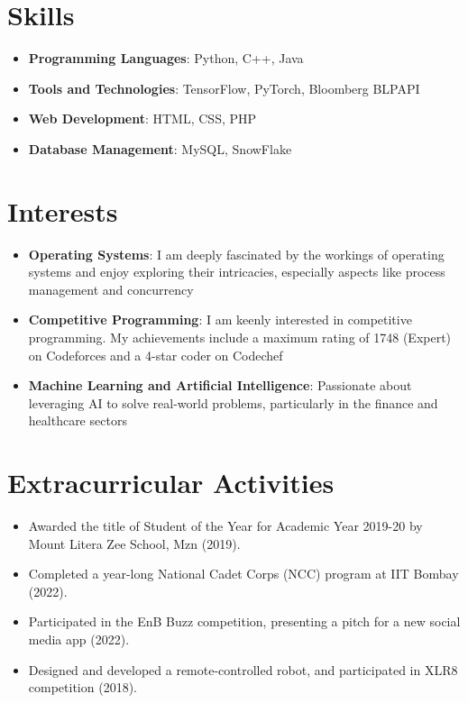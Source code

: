 \documentclass[11pt,letterpaper,sans]{moderncv}
\begin{document}
\vspace{-10pt}

\section{\LARGE Skills}
\vspace{-4pt}
\begin{itemize}[noitemsep, topsep=0pt]
\item \textbf{Programming Languages}: Python, C++, Java
\item \textbf{Tools and Technologies}: TensorFlow, PyTorch, Bloomberg BLPAPI
\item \textbf{Web Development}: HTML, CSS, PHP
\item \textbf{Database Management}: MySQL, SnowFlake
\end{itemize}

\vspace{-10pt}

\section{\LARGE Interests}
\vspace{-4pt}
\begin{itemize}[noitemsep, topsep=0pt]
\item \textbf{Operating Systems}: I am deeply fascinated by the workings of operating systems and enjoy exploring their intricacies, especially aspects like process management and concurrency 
\item \textbf{Competitive Programming}: I am keenly interested in competitive programming. My achievements include a maximum rating of 1748 (Expert) on Codeforces and a 4-star coder on Codechef 
\item \textbf{Machine Learning and Artificial Intelligence}: Passionate about leveraging AI to solve real-world problems, particularly in the finance and healthcare sectors
\end{itemize}
\vspace{-10pt}
\section{\LARGE Extracurricular Activities}
\vspace{-4pt}
\begin{itemize}[noitemsep, topsep=0pt, leftmargin=*]
\setlength\itemsep{\subpointspacing}
\item Awarded the title of Student of the Year for Academic Year 2019-20 by Mount Litera Zee School, Mzn (2019).
\item Completed a year-long National Cadet Corps (NCC) program at IIT Bombay (2022).
\item Participated in the EnB Buzz competition, presenting a pitch for a new social media app (2022).
\item Designed and developed a remote-controlled robot, and participated in XLR8 competition (2018).
\end{itemize}
\end{document}
